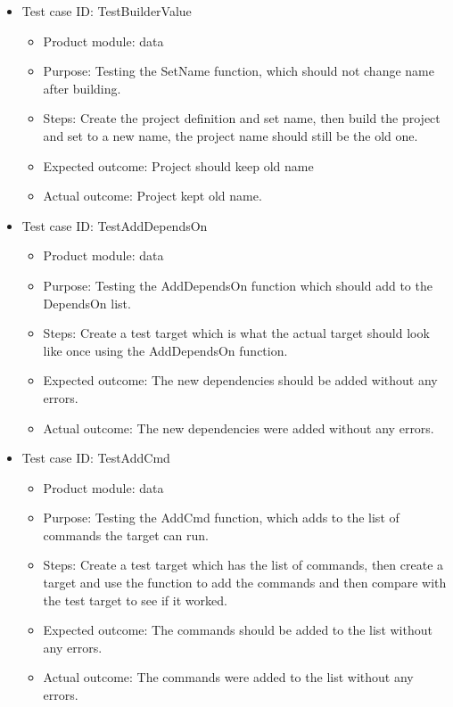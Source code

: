 \documentclass[11pt]{article}
\begin{document}
\begin{itemize}
    \item Test case ID: TestBuilderValue
    \begin{itemize}
        \item Product module: data
        \item Purpose: Testing the SetName function, which should not change name after building.
        \item Steps: Create the project definition and set name, then build the project and set to a new name, the project name should still be the old one.
        \item Expected outcome: Project should keep old name
        \item Actual outcome: Project kept old name.
    \end{itemize}
\end{itemize}

\begin{itemize}
    \item Test case ID: TestAddDependsOn
    \begin{itemize}
        \item Product module: data
        \item Purpose: Testing the AddDependsOn function which should add to the DependsOn list.
        \item Steps: Create a test target which is what the actual target should look like once using the AddDependsOn function.
        \item Expected outcome: The new dependencies should be added without any errors.
        \item Actual outcome: The new dependencies were added without any errors.
    \end{itemize}
\end{itemize}

\begin{itemize}
    \item Test case ID: TestAddCmd
    \begin{itemize}
        \item Product module: data
        \item Purpose: Testing the AddCmd function, which adds to the list of commands the target can run.
        \item Steps: Create a test target which has the list of commands, then create a target and use the function to add the commands and then compare with the test target to see if it worked.
        \item Expected outcome: The commands should be added to the list without any errors.
        \item Actual outcome: The commands were added to the list without any errors.
    \end{itemize}
\end{itemize}
\end{document}
